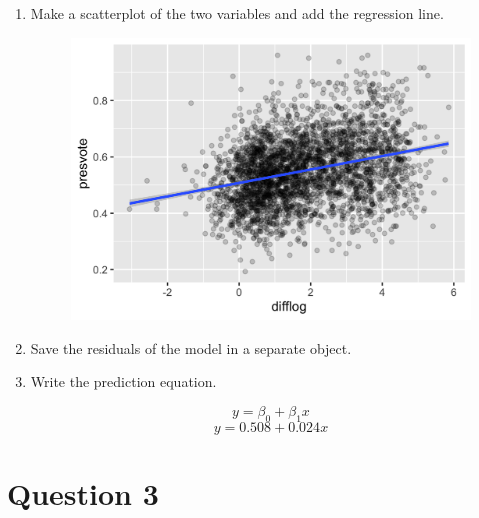 \documentclass[12pt,letterpaper]{article}
\begin{document}
\begin{enumerate}
			\vspace{5cm}
		\item Make a scatterplot of the two variables and add the regression line. 
		
			
\begin{figure}[H]
	\centering
	\includegraphics[width=0.7\linewidth]{lm2_plot}
	\caption{}
	\label{fig:lm2plot}
\end{figure}
		
			\vspace{1cm}
		\item Save the residuals of the model in a separate object.
				
			\vspace{1cm}
		\item Write the prediction equation.
		
			$$y = \beta_0 + \beta_1 x$$
			$$y = 0.508+0.024x$$
	\end{enumerate}
	
	\newpage	
\section*{Question 3}
\end{document}
